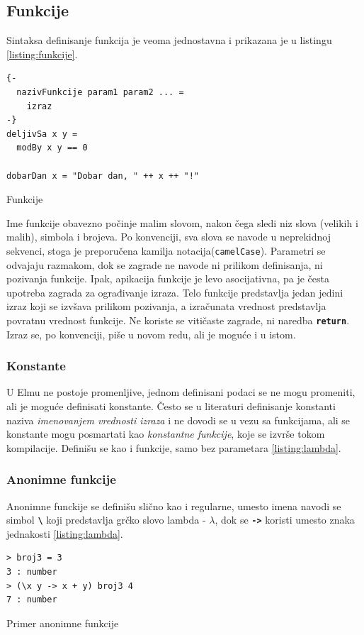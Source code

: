 \documentclass[12pt,oneside]{memoir}
\begin{document}
\subsection{Funkcije}  
Sintaksa definisanje funkcija je veoma jednostavna i prikazana je u listingu 
\ref{listing:funkcije}.
\begin{listing}[h]
\begin{verbatim}
{-
  nazivFunkcije param1 param2 ... =
    izraz  
-}
deljivSa x y =
  modBy x y == 0

dobarDan x = "Dobar dan, " ++ x ++ "!"  
\end{verbatim}
\caption{Funkcije}
\label{listing:funkcije}
\end{listing}

Ime funkcije obavezno počinje malim slovom, nakon čega sledi niz slova (velikih i malih),
simbola \texttt{\textbf{\textunderscore}} i brojeva. Po konvenciji, sva slova se navode u
neprekidnoj sekvenci, stoga je preporučena kamilja notacija(\texttt{camelCase}).
Parametri se odvajaju razmakom, dok se zagrade ne navode ni prilikom definisanja, ni
pozivanja funkcije. Ipak, apikacija funkcije je levo asocijativna, pa je česta upotreba
zagrada za ograđivanje izraza. Telo funkcije predstavlja jedan jedini izraz koji se izvšava
prilikom pozivanja, a izračunata vrednost predstavlja povratnu vrednost funkcije. Ne koriste
se vitičaste zagrade, ni naredba \texttt{\textbf{return}}. Izraz se, po konvenciji, piše u
novom redu, ali je moguće i u istom\label{listing:funkcije}.

\subsubsection{Konstante}
U Elmu ne postoje promenljive, jednom definisani podaci se ne mogu promeniti, ali je 
moguće definisati konstante. Često se u literaturi definisanje konstanti naziva 
\emph{imenovanjem vrednosti izraza} i ne dovodi se u vezu sa funkcijama, ali se konstante 
mogu posmartati kao \emph{konstantne funkcije}, koje se izvrše tokom kompilacije. Definišu se
kao i funkcije, samo bez parametara \ref{listing:lambda}.

\subsubsection{Anonimne funkcije}
Anonimne funckije se definišu slično kao i regularne, umesto imena navodi se simbol 
\texttt{\textbf{\textbackslash}} koji predstavlja grčko slovo lambda - \(\lambda\),
dok se \texttt{\textbf{->}} koristi umesto znaka jednakosti \ref{listing:lambda}.
\begin{listing}[h]
\begin{verbatim}
> broj3 = 3
3 : number
> (\x y -> x + y) broj3 4
7 : number
\end{verbatim}
\caption{Primer anonimne funkcije}
\label{listing:lambda}
\end{listing}
\end{document}
